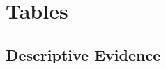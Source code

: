 \documentclass[12pt]{article}
\begin{document}
	
	
	
	\clearpage

\section{Tables}
	

	
	\subsection{Descriptive Evidence}
	
	
	
\end{document}
